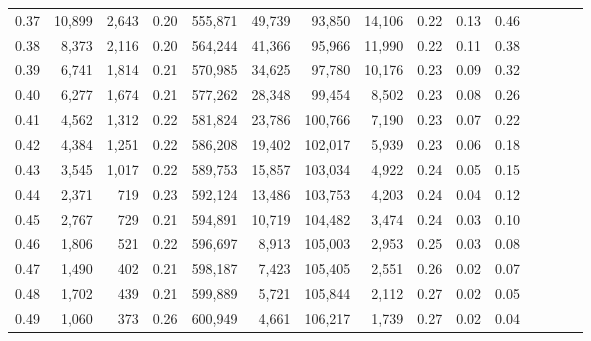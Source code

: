 \begin{tabular}{rrrcrrrrrrrrrrr}
0.37 &   10,899 &   2,643 &                                       0.20 &  555,871 &   49,739 &   93,850 &   14,106 &  0.22 &  0.13 &                         0.46 \\
0.38 &    8,373 &   2,116 &                                       0.20 &  564,244 &   41,366 &   95,966 &   11,990 &  0.22 &  0.11 &                         0.38 \\
0.39 &    6,741 &   1,814 &                                       0.21 &  570,985 &   34,625 &   97,780 &   10,176 &  0.23 &  0.09 &                         0.32 \\
0.40 &    6,277 &   1,674 &                                       0.21 &  577,262 &   28,348 &   99,454 &    8,502 &  0.23 &  0.08 &                         0.26 \\
0.41 &    4,562 &   1,312 &                                       0.22 &  581,824 &   23,786 &  100,766 &    7,190 &  0.23 &  0.07 &                         0.22 \\
0.42 &    4,384 &   1,251 &                                       0.22 &  586,208 &   19,402 &  102,017 &    5,939 &  0.23 &  0.06 &                         0.18 \\
0.43 &    3,545 &   1,017 &                                       0.22 &  589,753 &   15,857 &  103,034 &    4,922 &  0.24 &  0.05 &                         0.15 \\
0.44 &    2,371 &     719 &                                       0.23 &  592,124 &   13,486 &  103,753 &    4,203 &  0.24 &  0.04 &                         0.12 \\
0.45 &    2,767 &     729 &                                       0.21 &  594,891 &   10,719 &  104,482 &    3,474 &  0.24 &  0.03 &                         0.10 \\
0.46 &    1,806 &     521 &                                       0.22 &  596,697 &    8,913 &  105,003 &    2,953 &  0.25 &  0.03 &                         0.08 \\
0.47 &    1,490 &     402 &                                       0.21 &  598,187 &    7,423 &  105,405 &    2,551 &  0.26 &  0.02 &                         0.07 \\
0.48 &    1,702 &     439 &                                       0.21 &  599,889 &    5,721 &  105,844 &    2,112 &  0.27 &  0.02 &                         0.05 \\
0.49 &    1,060 &     373 &                                       0.26 &  600,949 &    4,661 &  106,217 &    1,739 &  0.27 &  0.02 &                         0.04 \\

\end{tabular}
